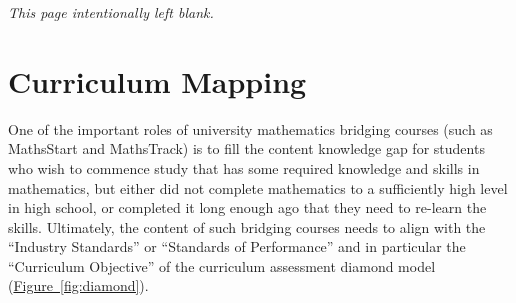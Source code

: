 \documentclass[twoside,12pt,a4paper]{report}
\makeatletter
\newcommand*{\intentionallyblankpage}{
  \vspace*{\fill}
  {\centering \textit{This page intentionally left blank.} \par}
  \vspace{\fill}}
\renewcommand*{\cleardoublepage}{\clearpage\if@twoside \ifodd\c@page\else
  \intentionallyblankpage
  \newpage
  \if@twocolumn\hbox{}\newpage\fi\fi\fi}
\newcommand{\reffig}[1]{\hyperref[fig:#1]{Figure~\ref{fig:#1}}}
\makeatother
\begin{document}
\cleardoublepage
\chapter{Curriculum Mapping}
\label{chap:curriculum}


One of the important roles of university mathematics bridging courses (such as MathsStart and MathsTrack) is to fill the content knowledge gap for students who  wish to commence study that has some required knowledge and skills in mathematics, but either did not complete mathematics to a sufficiently high level in high school, or completed it long enough ago that they need to re-learn the skills. Ultimately, the content of such bridging courses needs to align with the ``Industry Standards'' or ``Standards of Performance'' and in particular the ``Curriculum Objective'' of the curriculum assessment diamond model (\reffig{diamond}). 
\end{document}
